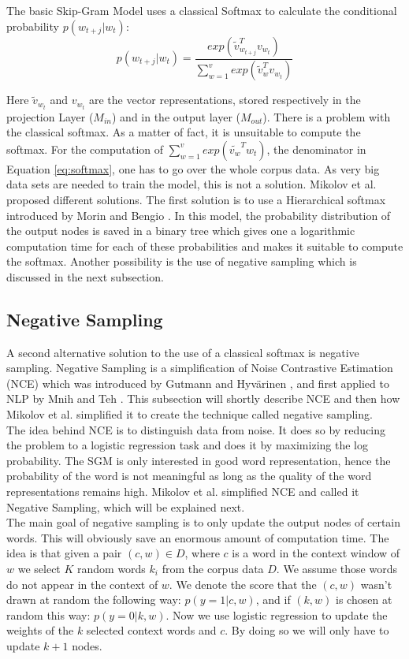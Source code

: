 The basic Skip-Gram Model uses a classical Softmax to calculate the conditional probability $p(w_{t+j}|w_t)$:
\begin{equation} \label{eq:softmax}
p(w_{t+j}|w_t)= \frac{exp( \tilde{v}_{w_{t+j}}^Tv_{w_t})}{\sum_{w=1}^v exp(\tilde{v}_w^Tv_{ w_t})}
\end{equation}

Here $\tilde{v}_{w_t}$ and $ v_{w_t}$ are the vector representations, stored respectively in the projection Layer ($M_{in}$) and in the output layer ($M_{out}$). There is a problem with the classical softmax. As a matter of fact, it is unsuitable to compute the softmax. For the computation of $\sum_{w=1}^v exp(\tilde{v_w}^T w_t)$, the denominator in Equation \ref{eq:softmax}, one has to go over the whole corpus data. As very big data sets are needed to train the model, this is not a solution. Mikolov et al. \cite{mikolov2} proposed different solutions. The first solution is to use a Hierarchical softmax introduced by Morin and Bengio \cite{hsoftmax}. In this model, the probability distribution of the output nodes is saved in a binary tree which gives one a logarithmic computation time for each of these probabilities and makes it suitable to compute the softmax. Another possibility is the use of negative sampling which is discussed in the next subsection.

\subsection{Negative Sampling}
A second alternative solution to the use of a classical softmax is negative sampling. Negative Sampling is a simplification of Noise Contrastive Estimation (NCE) which was introduced by Gutmann and Hyv{\"a}rinen \cite{nce-original}, and first applied to NLP by Mnih and Teh \cite{mnih}. This subsection will shortly describe NCE and then how Mikolov et al. \cite{mikolov2} simplified it to create the technique called negative sampling. \\ The idea behind NCE is to distinguish data from noise. It does so by reducing the problem to a logistic regression task and does it by maximizing the log probability. The SGM is only interested in good word representation, hence the probability of the word is not meaningful as long as the quality of the word representations remains high. Mikolov et al. \cite{mikolov2} simplified NCE and called it Negative Sampling, which will be explained next.\\
The main goal of negative sampling is to only update the output nodes of certain words. This will obviously save an enormous amount of computation time. The idea is that given a pair $(c,w) \in D$, where $c$ is a word in the context window of $w$ we select $K$ random words $k_i$ from the corpus data $D$. We assume those words do not appear in the context of $w$. We denote the score that the $(c,w)$ wasn't drawn at random the following way: $p(y=1|c,w)$, and if $(k,w) $ is chosen at random this way: $p(y=0|k,w)$. Now we use logistic regression to update the weights of the $k$ selected context words and $c$. By doing so we will only have to update $k+1$ nodes.

